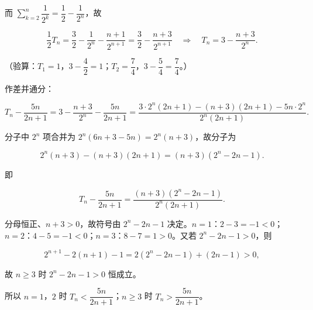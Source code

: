 \begin{answer}
而 $\sum_{k=2}^n\dfrac1{2^k}=\dfrac12-\dfrac1{2^n}$，故

\nopagebreak[4]
\[\frac12T_n=\frac32-\frac{1}{2^n}-\frac{n+1}{2^{n+1}}
=\frac32-\frac{n+3}{2^{n+1}}\quad\Longrightarrow\quad T_n=3-\frac{n+3}{2^n}.\]

（验算：$T_1=1$，$3-\dfrac42=1$；$T_2=\dfrac74$，$3-\dfrac54=\dfrac74$。）

作差并通分：

\nopagebreak[4]
\[T_n-\frac{5n}{2n+1}=3-\frac{n+3}{2^n}-\frac{5n}{2n+1}
=\frac{3\cdot2^n(2n+1)-(n+3)(2n+1)-5n\cdot2^n}{2^n(2n+1)}.\]

分子中 $2^n$ 项合并为 $2^n\left(6n+3-5n\right)=2^n(n+3)$，故分子为

\nopagebreak[4]
\[2^n(n+3)-(n+3)(2n+1)=(n+3)\left(2^n-2n-1\right).\]

即

\nopagebreak[4]
\[T_n-\frac{5n}{2n+1}=\frac{(n+3)\left(2^n-2n-1\right)}{2^n(2n+1)}.\]

分母恒正、$n+3>0$，故符号由 $2^n-2n-1$ 决定。$n=1$：$2-3=-1<0$；$n=2$：$4-5=-1<0$；$n=3$：$8-7=1>0$。又若 $2^n-2n-1>0$，则

\nopagebreak[4]
\[2^{n+1}-2(n+1)-1=2\left(2^n-2n-1\right)+(2n-1)>0,\]

故 $n\geqslant3$ 时 $2^n-2n-1>0$ 恒成立。

所以 $n=1$，$2$ 时 $T_n<\dfrac{5n}{2n+1}$；$n\geqslant3$ 时 $T_n>\dfrac{5n}{2n+1}$。


\end{answer}
